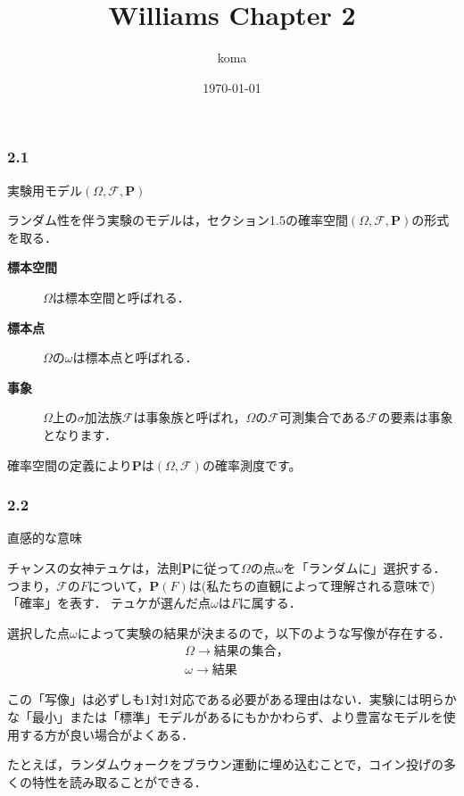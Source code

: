 \documentclass{jsarticle}
\title{Williams Chapter 2}
\author{koma}
\date{\today}
\begin{document}
\maketitle

\subsubsection*{2.1}
実験用モデル$(\Omega,\mathcal{F},\mathbf{P})$

ランダム性を伴う実験のモデルは，セクション1.5の確率空間$(\Omega,\mathcal{F},\mathbf{P})$の形式を取る．

\begin{description}
    \item[\bf 標本空間] 
        $\Omega$は標本空間と呼ばれる．
    \item[\bf 標本点] 
        $\Omega$の$\omega$は標本点と呼ばれる．
    \item[\bf 事象] 
        $\Omega$上の$\sigma$加法族$\mathcal{F}$は事象族と呼ばれ，$\Omega$の$\mathcal{F}$可測集合である$\mathcal{F}$の要素は事象となります．
\end{description}

確率空間の定義により$\mathbf{P}$は$(\Omega,\mathcal{F})$の確率測度です。

\subsubsection*{2.2}
直感的な意味

チャンスの女神テュケは，法則$\mathbf{P}$に従って$\Omega$の点$\omega$を「ランダムに」選択する．
つまり，$\mathcal{F}$の$F$について，$\mathbf{P}(F)$は(私たちの直観によって理解される意味で) 「確率」を表す．
テュケが選んだ点$\omega$は$F$に属する．

選択した点$\omega$によって実験の結果が決まるので，以下のような写像が存在する．
\begin{align}
    &\Omega \rightarrow 結果の集合 ， \nonumber \\
    &\omega \rightarrow 結果\nonumber
\end{align}

この「写像」は必ずしも1対1対応である必要がある理由はない．実験には明らかな「最小」または「標準」モデルがあるにもかかわらず、より豊富なモデルを使用する方が良い場合がよくある．

たとえば，ランダムウォークをブラウン運動に埋め込むことで，コイン投げの多くの特性を読み取ることができる．
\end{document}
